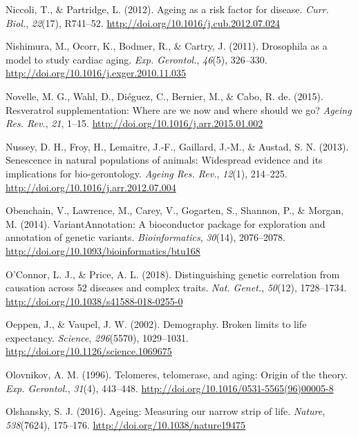 \documentclass[12pt,twoside]{unicam}
\begin{document}
\begin{cslreferences}
\leavevmode\hypertarget{ref-Niccoli2012}{}%
Niccoli, T., \& Partridge, L. (2012). Ageing as a risk factor for disease. \emph{Curr. Biol.}, \emph{22}(17), R741--52. \url{http://doi.org/10.1016/j.cub.2012.07.024}

\leavevmode\hypertarget{ref-Nishimura2011}{}%
Nishimura, M., Ocorr, K., Bodmer, R., \& Cartry, J. (2011). Drosophila as a model to study cardiac aging. \emph{Exp. Gerontol.}, \emph{46}(5), 326--330. \url{http://doi.org/10.1016/j.exger.2010.11.035}

\leavevmode\hypertarget{ref-Novelle2015}{}%
Novelle, M. G., Wahl, D., Diéguez, C., Bernier, M., \& Cabo, R. de. (2015). Resveratrol supplementation: Where are we now and where should we go? \emph{Ageing Res. Rev.}, \emph{21}, 1--15. \url{http://doi.org/10.1016/j.arr.2015.01.002}

\leavevmode\hypertarget{ref-Nussey2013}{}%
Nussey, D. H., Froy, H., Lemaitre, J.-F., Gaillard, J.-M., \& Austad, S. N. (2013). Senescence in natural populations of animals: Widespread evidence and its implications for bio-gerontology. \emph{Ageing Res. Rev.}, \emph{12}(1), 214--225. \url{http://doi.org/10.1016/j.arr.2012.07.004}

\leavevmode\hypertarget{ref-Obenchain2014}{}%
Obenchain, V., Lawrence, M., Carey, V., Gogarten, S., Shannon, P., \& Morgan, M. (2014). VariantAnnotation: A bioconductor package for exploration and annotation of genetic variants. \emph{Bioinformatics}, \emph{30}(14), 2076--2078. \url{http://doi.org/10.1093/bioinformatics/btu168}

\leavevmode\hypertarget{ref-OConnor2018}{}%
O'Connor, L. J., \& Price, A. L. (2018). Distinguishing genetic correlation from causation across 52 diseases and complex traits. \emph{Nat. Genet.}, \emph{50}(12), 1728--1734. \url{http://doi.org/10.1038/s41588-018-0255-0}

\leavevmode\hypertarget{ref-Oeppen2002}{}%
Oeppen, J., \& Vaupel, J. W. (2002). Demography. Broken limits to life expectancy. \emph{Science}, \emph{296}(5570), 1029--1031. \url{http://doi.org/10.1126/science.1069675}

\leavevmode\hypertarget{ref-Olovnikov1996}{}%
Olovnikov, A. M. (1996). Telomeres, telomerase, and aging: Origin of the theory. \emph{Exp. Gerontol.}, \emph{31}(4), 443--448. \url{http://doi.org/10.1016/0531-5565(96)00005-8}

\leavevmode\hypertarget{ref-Olshansky2016}{}%
Olshansky, S. J. (2016). Ageing: Measuring our narrow strip of life. \emph{Nature}, \emph{538}(7624), 175--176. \url{http://doi.org/10.1038/nature19475}


\end{cslreferences}
\end{document}
